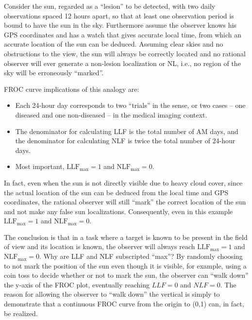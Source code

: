 \documentclass[
]{book}
\providecommand{\tightlist}{%
  \setlength{\itemsep}{0pt}\setlength{\parskip}{0pt}}
\begin{document}
Consider the sun, regarded as a ``lesion'' to be detected, with two daily observations spaced 12 hours apart, so that at least one observation period is bound to have the sun in the sky. Furthermore assume the observer knows his GPS coordinates and has a watch that gives accurate local time, from which an accurate location of the sun can be deduced. Assuming clear skies and no obstructions to the view, the sun will always be correctly located and no rational observer will ever generate a non-lesion localization or NL, i.e., no region of the sky will be erroneously ``marked''.

FROC curve implications of this analogy are:

\begin{itemize}
\tightlist
\item
  Each 24-hour day corresponds to two ``trials'' in the \citep{RN897} sense, or two cases -- one diseased and one non-diseased -- in the medical imaging context.
\item
  The denominator for calculating LLF is the total number of AM days, and the denominator for calculating NLF is twice the total number of 24-hour days.
\item
  Most important, \(\text{LLF}_{\text{max}} = 1\) and \(\text{NLF}_{\text{max}} = 0\).
\end{itemize}

In fact, even when the sun is not directly visible due to heavy cloud cover, since the actual location of the sun can be deduced from the local time and GPS coordinates, the rational observer will still ``mark'' the correct location of the sun and not make any false sun localizations. Consequently, even in this example \(\text{LLF}_{\text{max}} = 1\) and \(\text{NLF}_{\text{max}} = 0\).

The conclusion is that in a task where a target is known to be present in the field of view and its location is known, the observer will always reach \(\text{LLF}_{\text{max}} = 1\) and \(\text{NLF}_{\text{max}} = 0\). Why are LLF and NLF subscripted ``max''? By randomly choosing to not mark the position of the sun even though it is visible, for example, using a coin toss to decide whether or not to mark the sun, the observer can ``walk down'' the y-axis of the FROC plot, eventually reaching \(LLF = 0\) and \(NLF = 0\). The reason for allowing the observer to ``walk down'' the vertical is simply to demonstrate that a continuous FROC curve from the origin to (0,1) can, in fact, be realized.
\end{document}

